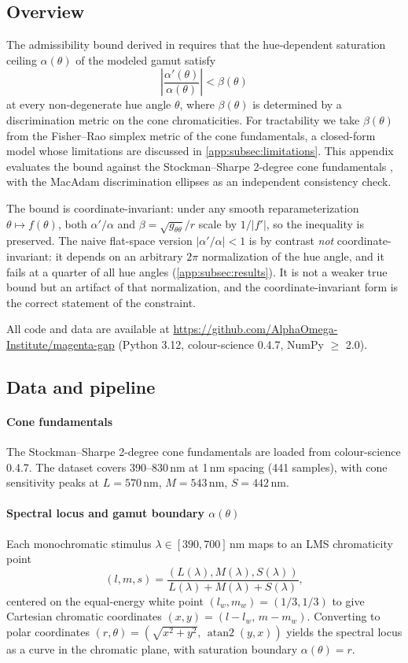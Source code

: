 \documentclass[preprint,12pt,authoryear]{elsarticle}
\theoremstyle{plain}
\theoremstyle{definition}
\theoremstyle{remark}
\begin{document}
\subsection{Overview}
\label{app:subsec:overview}

\noindent The admissibility bound derived in  requires that the hue-dependent saturation ceiling $\alpha(\theta)$ of the modeled gamut satisfy
\[
\left|\frac{\alpha'(\theta)}{\alpha(\theta)}\right| < \beta(\theta)
\]
at every non-degenerate hue angle $\theta$, where $\beta(\theta)$ is determined by a discrimination metric on the cone chromaticities. For tractability we take $\beta(\theta)$ from the Fisher--Rao simplex metric of the cone fundamentals, a closed-form model whose limitations are discussed in \ref{app:subsec:limitations}. This appendix evaluates the bound against the Stockman--Sharpe 2-degree cone fundamentals \citep{Stockman2000}, with the MacAdam discrimination ellipses \citep{MacAdam1942} as an independent consistency check.

The bound is coordinate-invariant: under any smooth reparameterization $\theta\mapsto f(\theta)$, both $\alpha'/\alpha$ and $\beta=\sqrt{g_{\theta\theta}}/r$ scale by $1/|f'|$, so the inequality is preserved. The naive flat-space version $|\alpha'/\alpha|<1$ is by contrast \emph{not} coordinate-invariant: it depends on an arbitrary $2\pi$ normalization of the hue angle, and it fails at a quarter of all hue angles (\ref{app:subsec:results}). It is not a weaker true bound but an artifact of that normalization, and the coordinate-invariant form is the correct statement of the constraint.

All code and data are available at \url{https://github.com/AlphaOmega-Institute/magenta-gap} (Python 3.12, colour-science 0.4.7, NumPy $\geq$ 2.0).

\subsection{Data and pipeline}
\label{app:subsec:pipeline}

\paragraph{Cone fundamentals}
The Stockman--Sharpe 2-degree cone fundamentals are loaded from colour-science 0.4.7. The dataset covers 390--830\,nm at 1\,nm spacing (441 samples), with cone sensitivity peaks at $L=570$\,nm, $M=543$\,nm, $S=442$\,nm.

\paragraph{Spectral locus and gamut boundary \texorpdfstring{$\alpha(\theta)$}{alpha(theta)}}
Each monochromatic stimulus $\lambda\in[390,700]$\,nm maps to an LMS chromaticity point
\[
(l,m,s)=\frac{(L(\lambda),M(\lambda),S(\lambda))}{L(\lambda)+M(\lambda)+S(\lambda)},
\]
centered on the equal-energy white point $(l_w,m_w)=(1/3,1/3)$ to give Cartesian chromatic coordinates $(x,y)=(l-l_w,\,m-m_w)$. Converting to polar coordinates $(r,\theta)=(\sqrt{x^2+y^2},\,\operatorname{atan2}(y,x))$ yields the spectral locus as a curve in the chromatic plane, with saturation boundary $\alpha(\theta)=r$.
\end{document}
